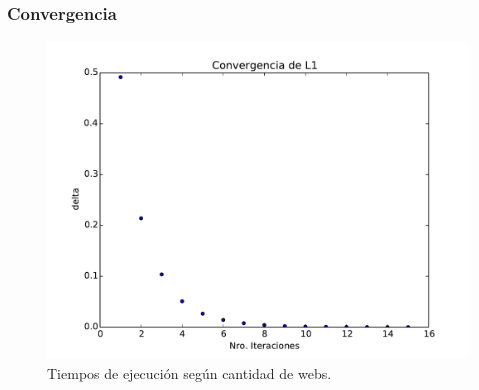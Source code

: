\subsubsection{Convergencia}

\begin{figure}[h]
\centering
\includegraphics[scale=0.7]{images/conv_2265.pdf}
\caption{Tiempos de ejecución según cantidad de webs.}
\label{timePageRank}
\end{figure}